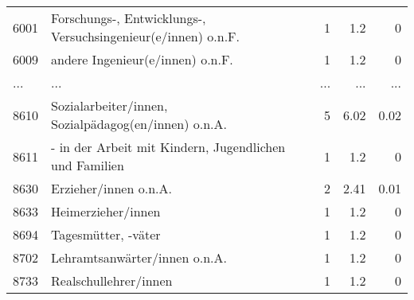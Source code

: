 \begin{longtable}{lXrrr}
        6001 & \multicolumn{1}{X}{Forschungs-, Entwicklungs-, Versuchsingenieur(e/innen) o.n.F.} & %
          \num{1} &
          \num[round-mode=places,round-precision=2]{1,2} &
          \num[round-mode=places,round-precision=2]{0} \\
        6009 & \multicolumn{1}{X}{andere Ingenieur(e/innen) o.n.F.} & %
          \num{1} &
          \num[round-mode=places,round-precision=2]{1,2} &
          \num[round-mode=places,round-precision=2]{0} \\
       ... & ... & ... & ... & ... \\
        8610 & \multicolumn{1}{X}{Sozialarbeiter/innen, Sozialpädagog(en/innen) o.n.A.} & %
          \num{5} &
          \num[round-mode=places,round-precision=2]{6,02} &
          \num[round-mode=places,round-precision=2]{0,02} \\

        8611 & \multicolumn{1}{X}{- in der Arbeit mit Kindern, Jugendlichen und Familien} & %
          \num{1} &
          \num[round-mode=places,round-precision=2]{1,2} &
          \num[round-mode=places,round-precision=2]{0} \\

        8630 & \multicolumn{1}{X}{Erzieher/innen o.n.A.} & %
          \num{2} &
          \num[round-mode=places,round-precision=2]{2,41} &
          \num[round-mode=places,round-precision=2]{0,01} \\

        8633 & \multicolumn{1}{X}{Heimerzieher/innen} & %
          \num{1} &
          \num[round-mode=places,round-precision=2]{1,2} &
          \num[round-mode=places,round-precision=2]{0} \\

        8694 & \multicolumn{1}{X}{Tagesmütter, -väter} & %
          \num{1} &
          \num[round-mode=places,round-precision=2]{1,2} &
          \num[round-mode=places,round-precision=2]{0} \\

        8702 & \multicolumn{1}{X}{Lehramtsanwärter/innen o.n.A.} & %
          \num{1} &
          \num[round-mode=places,round-precision=2]{1,2} &
          \num[round-mode=places,round-precision=2]{0} \\

        8733 & \multicolumn{1}{X}{Realschullehrer/innen} & %
          \num{1} &
          \num[round-mode=places,round-precision=2]{1,2} &
          \num[round-mode=places,round-precision=2]{0} \\


\end{longtable}
